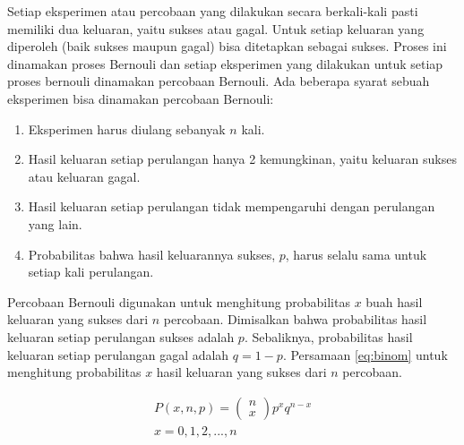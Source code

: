 Setiap eksperimen atau percobaan yang dilakukan secara berkali-kali pasti memiliki dua keluaran, yaitu sukses atau gagal. Untuk setiap keluaran yang diperoleh (baik sukses maupun gagal) bisa ditetapkan sebagai sukses. Proses ini dinamakan proses Bernouli dan setiap eksperimen yang dilakukan untuk setiap proses bernouli dinamakan percobaan Bernouli. Ada beberapa syarat sebuah eksperimen bisa dinamakan percobaan Bernouli\cite{walpole1993probability}:
\begin{enumerate}
	\item Eksperimen harus diulang sebanyak \begin{math}n\end{math} kali.
	\item Hasil keluaran setiap perulangan hanya 2 kemungkinan, yaitu keluaran sukses atau keluaran gagal.
	\item Hasil keluaran setiap perulangan tidak mempengaruhi dengan perulangan yang lain.
	\item Probabilitas bahwa hasil keluarannya sukses, \begin{math}p\end{math}, harus selalu sama untuk setiap kali perulangan.
\end{enumerate}

Percobaan Bernouli digunakan untuk menghitung probabilitas \begin{math}x\end{math} buah hasil keluaran yang sukses dari \begin{math}n\end{math} percobaan. Dimisalkan bahwa probabilitas hasil keluaran setiap perulangan sukses adalah \begin{math}p\end{math}. Sebaliknya, probabilitas hasil keluaran setiap perulangan gagal adalah \begin{math}q=1-p\end{math}. Persamaan \ref{eq:binom} untuk menghitung probabilitas \begin{math}x\end{math} hasil keluaran yang sukses dari \begin{math}n\end{math} percobaan.

\begin{gather}
	P(x,n,p) = \left( {\begin{array}{c}n \\ x \end{array}} \right) p^x q^{n-x} \label{eq:binom} \\
	x = 0, 1, 2, ..., n \nonumber
\end{gather}

